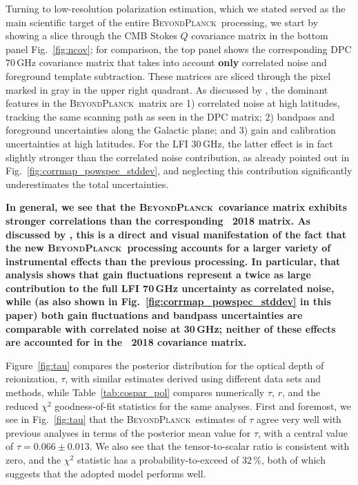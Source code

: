 \documentclass[twocolumn]{aa}
\newcommand{\BP}{\textsc{BeyondPlanck}}
\begin{document}
Turning to low-resolution polarization estimation, which we stated
served as the main scientific target of the entire \BP\ processing, we
start by showing a slice through the CMB Stokes $Q$ covariance matrix
in the bottom panel Fig.~\ref{fig:ncov}; for comparison, the top panel
shows the corresponding DPC 70\,GHz covariance matrix that takes into
account {\bf only} correlated noise and foreground template subtraction. These
matrices are sliced through the pixel marked in gray in the upper
right quadrant. As discussed by \citet{bp11}, the dominant features in
the \BP\ matrix are 1) correlated noise at high latitudes, tracking
the same scanning path as seen in the DPC matrix; 2) bandpass and
foreground uncertainties along the Galactic plane; and 3) gain and
calibration uncertainties at high latitudes. For the LFI 30\,GHz, the
latter effect is in fact slightly stronger than the correlated noise
contribution, as already pointed out in
Fig.~\ref{fig:corrmap_powspec_stddev}, and neglecting this
contribution significantly underestimates the total uncertainties.

{\bf In general, we see that the \BP\ covariance matrix exhibits stronger correlations than the corresponding \Planck\ 2018 matrix. As discussed by \citet{bp10}, this is a direct and visual manifestation of the fact that the new \BP\ processing accounts for a larger variety of instrumental effects than the previous processing. In particular, that analysis shows that gain fluctuations represent a twice as large contribution to the full LFI 70\,GHz uncertainty as correlated noise, while (as also shown in Fig.~\ref{fig:corrmap_powspec_stddev} in this paper) both gain fluctuations and bandpass uncertainties are comparable with correlated noise at 30\,GHz; neither of these effects are accounted for in the \Planck\ 2018 covariance matrix.} 

Figure~\ref{fig:tau} compares the posterior distribution for the
optical depth of reionization, $\tau$, with similar estimates derived
using different data sets and methods, while
Table~\ref{tab:cospar_pol} compares numerically $\tau$, $r$, and the
reduced $\chi^2$ goodness-of-fit statistics for the same
analyses. First and foremost, we see in Fig.~\ref{fig:tau} that the
\BP\ estimates of $\tau$ agree very well with previous analyses in
terms of the posterior mean value for $\tau$, with a central value of
$\tau=0.066\pm0.013$. We also see that the tensor-to-scalar ratio is
consistent with zero, and the $\chi^2$ statistic has a
probability-to-exceed of 32\,\%, both of which suggests that the
adopted model performs well.
\end{document}
